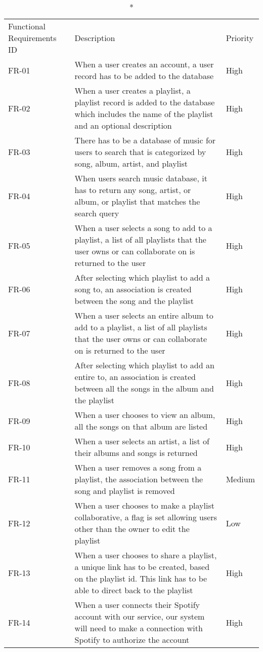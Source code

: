 \begin{longtable}{lXl}
			\caption*{Functional Requirements}
			\endfirsthead
			\endhead
			ID & Description & Priority \\
			FR-01 & When a user creates an account, a user record has to be added to the database & High \\
			FR-02 & When a user creates a playlist, a playlist record is added to the database which includes the name of the playlist and an optional description & High \\
			FR-03 & There has to be a database of music for users to search that is categorized by song, album, artist, and playlist & High \\
			FR-04 & When users search music database, it has to return any song, artist, or album, or playlist that matches the search query & High \\
			FR-05 & When a user selects a song to add to a playlist, a list of all playlists that the user owns or can collaborate on is returned to the user & High \\
			FR-06 & After selecting which playlist to add a song to, an association is created between the song and the playlist & High \\
			FR-07 & When a user selects an entire album to add to a playlist, a list of all playlists that the user owns or can collaborate on is returned to the user & High \\
			FR-08 & After selecting which playlist to add an entire to, an association is created between all the songs in the album and the playlist & High \\
			FR-09 & When a user chooses to view an album, all the songs on that album are listed & High \\
			FR-10 & When a user selects an artist, a list of their albums and songs is returned & High \\
			FR-11 & When a user removes a song from a playlist, the association between the song and playlist is removed & Medium \\
			FR-12 & When a user chooses to make a playlist collaborative, a flag is set allowing users other than the owner to edit the playlist & Low \\
			FR-13 & When a user chooses to share a playlist, a unique link has to be created, based on the playlist id. This link has to be able to direct back to the playlist & High \\
			FR-14 & When a user connects their Spotify account with our service, our system will need to make a connection with Spotify to authorize the account & High \\

\end{longtable}
